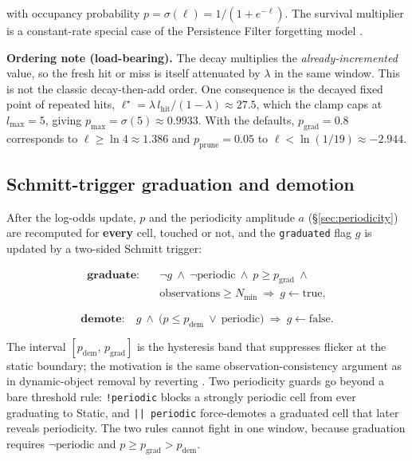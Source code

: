\documentclass[conference]{IEEEtran}
\begin{document}
with occupancy probability $p=\sigma(\ell)=1/(1+e^{-\ell})$. The survival
multiplier is a constant-rate special case of the Persistence Filter forgetting
model \cite{rosen2016persistence}.

\textbf{Ordering note (load-bearing).} The decay multiplies the \emph{already-incremented}
value, so the fresh hit or miss is itself attenuated by $\lambda$ in the same
window. This is not the classic decay-then-add order. One consequence is the
decayed fixed point of repeated hits,
$\ell^\star=\lambda\,l_{\text{hit}}/(1-\lambda)\approx 27.5$, which the clamp
caps at $l_{\max}=5$, giving $p_{\max}=\sigma(5)\approx 0.9933$. With the
defaults, $p_{\text{grad}}=0.8$ corresponds to $\ell\ge\ln 4\approx 1.386$ and
$p_{\text{prune}}=0.05$ to $\ell<\ln(1/19)\approx -2.944$.

\subsection{Schmitt-trigger graduation and demotion}
\label{sec:schmitt}

After the log-odds update, $p$ and the periodicity amplitude $a$
(\S\ref{sec:periodicity}) are recomputed for \textbf{every} cell, touched or not, and the
\texttt{graduated} flag $g$ is updated by a two-sided Schmitt trigger:

\begin{equation}
\begin{split}
\textbf{graduate:}\quad & \lnot g \ \land\ \lnot\text{periodic}\ \land\
p \ge p_{\text{grad}}\ \land\ \\
& \text{observations}\ge N_{\min}\
\Rightarrow\ g\leftarrow\text{true},
\end{split}
\end{equation}

\begin{equation}
\textbf{demote:}\quad g \ \land\ \big(p \le p_{\text{dem}}\ \lor\
\text{periodic}\big)\ \Rightarrow\ g\leftarrow\text{false}.
\end{equation}

The interval $[p_{\text{dem}},\,p_{\text{grad}}]$ is the hysteresis band that
suppresses flicker at the static boundary; the motivation is the same
observation-consistency argument as in dynamic-object removal by
reverting \cite{kim2020removert}. Two periodicity guards go beyond a bare
threshold rule: \texttt{!periodic} blocks a strongly periodic cell from ever
graduating to Static, and \texttt{|| periodic} force-demotes a graduated cell that
later reveals periodicity. The two rules cannot fight in one window, because
graduation requires $\lnot\text{periodic}$ and
$p\ge p_{\text{grad}}>p_{\text{dem}}$.
\end{document}
